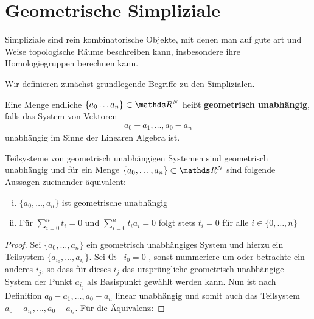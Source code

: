 





\section{Geometrische Simpliziale}

Simpliziale sind rein kombinatorische Objekte, mit denen man auf gute
art und Weise topologische Räume beschreiben kann, insbesondere ihre
Homologiegruppen berechnen kann.

Wir definieren zunächst grundlegende Begriffe zu den Simplizialen.

\begin{Def}
  Eine Menge endliche $\{ a_0\ldots a_n \} \subset \R^N$ heißt
  \textbf{geometrisch unabhängig}, falls das System von Vektoren
  \begin{gather*}
    a_0 - a_1 , \ldots , a_0 - a_n
  \end{gather*}
  unabhängig im Sinne der Linearen Algebra ist.

\end{Def}

\begin{Lem}
  Teilsysteme von geometrisch unabhängigen Systemen sind geometrisch
  unabhängig und für ein Menge $\{ a_0 , \ldots , a_n \} \subset \R^N$ sind folgende Aussagen zueinander äquivalent:
  \begin{enumerate}[i)]
  	\item $\{ a_0 , \ldots , a_n \}$ ist geometrische unabhängig
  	\item Für $\sum\limits_{i=0}^n t_i = 0$ und $\sum\limits_{i=0}^n t_i a_i = 0$ folgt stets $t_i = 0$ für alle $i \in \{ 0,\ldots,n\}$
  \end{enumerate}
  \begin{proof}
    Sei $\{ a_0 , \ldots , a_n \}$ ein geometrisch unabhängiges System und hierzu 
    ein Teilsystem $\{ a_{i_0},\ldots,a_{i_r} \}$. 
    Sei \OE~ $i_0 = 0$ , sonst nummeriere um oder betrachte ein anderes $i_j$, so dass für dieses $i_j$ das ursprüngliche geometrisch unabhängige System der Punkt $a_{i_j}$ als Basispunkt gewählt werden kann. Nun ist nach Definition $ a_0 - a_1 , \ldots , a_0 - a_n$ linear unabhängig und somit auch das Teilsystem $ a_0 - a_ {i_1}, \ldots , a_0 - a_{i_r}$.
    Für die Äquivalenz:
  \end{proof}
\end{Lem}

